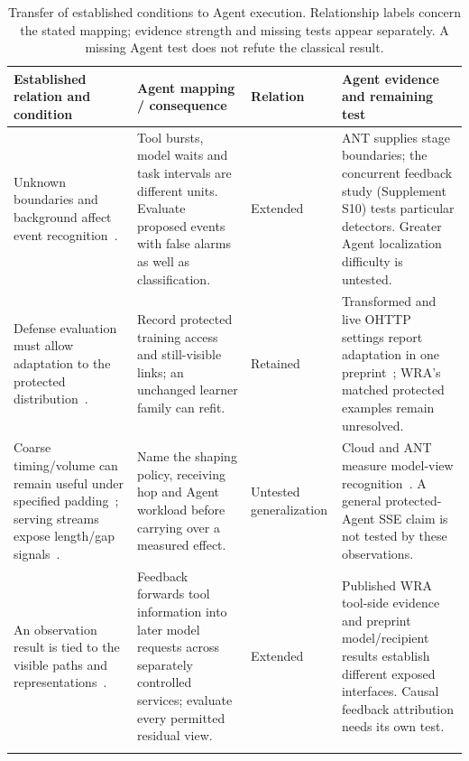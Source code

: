 \begin{table}[t]\centering\small
\caption{Transfer of established conditions to Agent execution. Relationship labels concern the stated mapping; evidence strength and missing tests appear separately. A missing Agent test does not refute the classical result.}\label{tab:transfer-matrix}
\setlength{\tabcolsep}{4pt}
\begin{tabularx}{\textwidth}{@{}P{.25\textwidth}P{.29\textwidth}P{.10\textwidth}Y@{}}\toprule
Established relation and condition & Agent mapping / consequence & Relation & Agent evidence and remaining test \\\midrule
Unknown boundaries and background affect event recognition~\cite{wang2016realistic,guan2021bapm,deng2023ares,trimananda2020pingpong}. & Tool bursts, model waits and task intervals are different units. Evaluate proposed events with false alarms as well as classification. & Extended & ANT supplies stage boundaries; the concurrent feedback study (Supplement S10) tests particular detectors. Greater Agent localization difficulty is untested. \\\addlinespace[3pt]
Defense evaluation must allow adaptation to the protected distribution~\cite{dyer2012peekaboo,mathews2023critical,tramer2020adaptive}. & Record protected training access and still-visible links; an unchanged learner family can refit. & Retained & Transformed and live OHTTP settings report adaptation in one preprint~\cite{dangol2026workflow}; WRA's matched protected examples remain unresolved. \\\addlinespace[3pt]
Coarse timing/volume can remain useful under specified padding~\cite{dyer2012peekaboo}; serving streams expose length/gap signals~\cite{weiss2024prompt,whisperleak2025}. & Name the shaping policy, receiving hop and Agent workload before carrying over a measured effect. & Untested generalization & Cloud and ANT measure model-view recognition~\cite{pouryousef2026traffic,li2026ant}. A general protected-Agent SSE claim is not tested by these observations. \\\addlinespace[3pt]
An observation result is tied to the visible paths and representations~\cite{chen2010web,apthorpe2019stp}. & Feedback forwards tool information into later model requests across separately controlled services; evaluate every permitted residual view. & Extended & Published WRA tool-side evidence and preprint model/recipient results establish different exposed interfaces. Causal feedback attribution needs its own test. \\\addlinespace[3pt]

\end{tabularx}
\end{table}
